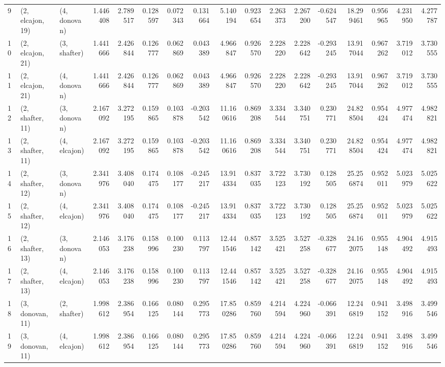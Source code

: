 \begin{tabular}{lllrrrrrrrrrrrrrr}
9  &  (2, elcajon, 19) &     (4, donovan) &  1.446408 &  2.789517 &   0.128597 &  0.072343 &  0.131664 &   5.140194 &  0.923654 &   2.263373 &  2.267200 & -0.624547 &  18.299461 &  0.956965 &  4.231950 &  4.277787 \\
10 &  (2, elcajon, 21) &     (3, shafter) &  1.441666 &  2.426844 &   0.126777 &  0.062869 &  0.043389 &   4.966847 &  0.926570 &   2.228220 &  2.228642 & -0.293245 &  13.917044 &  0.967262 &  3.719012 &  3.730555 \\
11 &  (2, elcajon, 21) &     (4, donovan) &  1.441666 &  2.426844 &   0.126777 &  0.062869 &  0.043389 &   4.966847 &  0.926570 &   2.228220 &  2.228642 & -0.293245 &  13.917044 &  0.967262 &  3.719012 &  3.730555 \\
12 &  (2, shafter, 11) &     (3, donovan) &  2.167092 &  3.272195 &   0.159865 &  0.103878 & -0.203542 &  11.160616 &  0.869208 &   3.334544 &  3.340751 &  0.230771 &  24.828504 &  0.954424 &  4.977474 &  4.982821 \\
13 &  (2, shafter, 11) &     (4, elcajon) &  2.167092 &  3.272195 &   0.159865 &  0.103878 & -0.203542 &  11.160616 &  0.869208 &   3.334544 &  3.340751 &  0.230771 &  24.828504 &  0.954424 &  4.977474 &  4.982821 \\
14 &  (2, shafter, 12) &     (3, donovan) &  2.341976 &  3.408040 &   0.174475 &  0.108177 & -0.245217 &  13.914334 &  0.837035 &   3.722123 &  3.730192 &  0.128505 &  25.256874 &  0.952011 &  5.023979 &  5.025622 \\
15 &  (2, shafter, 12) &     (4, elcajon) &  2.341976 &  3.408040 &   0.174475 &  0.108177 & -0.245217 &  13.914334 &  0.837035 &   3.722123 &  3.730192 &  0.128505 &  25.256874 &  0.952011 &  5.023979 &  5.025622 \\
16 &  (2, shafter, 13) &     (3, donovan) &  2.146053 &  3.176238 &   0.158996 &  0.100230 &  0.113797 &  12.441546 &  0.857142 &   3.525421 &  3.527258 & -0.328677 &  24.162075 &  0.955148 &  4.904492 &  4.915493 \\
17 &  (2, shafter, 13) &     (4, elcajon) &  2.146053 &  3.176238 &   0.158996 &  0.100230 &  0.113797 &  12.441546 &  0.857142 &   3.525421 &  3.527258 & -0.328677 &  24.162075 &  0.955148 &  4.904492 &  4.915493 \\
18 &  (3, donovan, 11) &     (2, shafter) &  1.998612 &  2.386954 &   0.166125 &  0.080144 &  0.295773 &  17.850286 &  0.859760 &   4.214594 &  4.224960 & -0.066391 &  12.246819 &  0.941152 &  3.498916 &  3.499546 \\
19 &  (3, donovan, 11) &     (4, elcajon) &  1.998612 &  2.386954 &   0.166125 &  0.080144 &  0.295773 &  17.850286 &  0.859760 &   4.214594 &  4.224960 & -0.066391 &  12.246819 &  0.941152 &  3.498916 &  3.499546 \\

\end{tabular}

